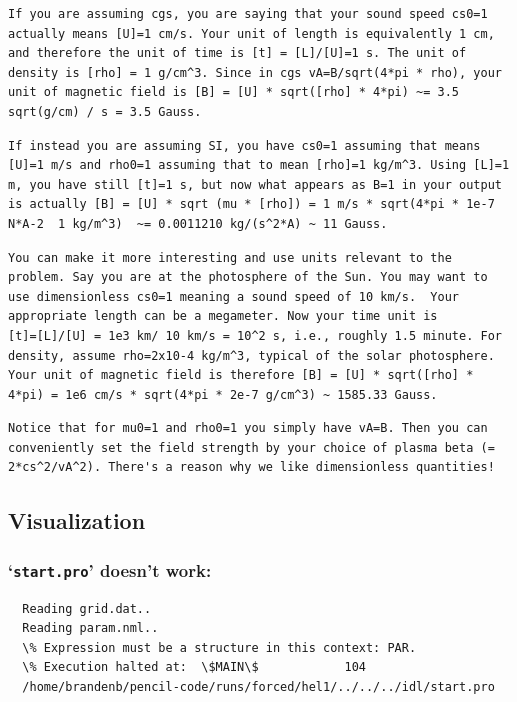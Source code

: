\documentclass[\mydriver,12pt,twoside,notitlepage,a4paper]{article}
\makeatletter
\newcommand{\file}[2][]{%
  \def\index@{#1}%
  `\texttt{#2}'%
  \ifx\index@\@empty\index[file]{#2@\texttt{#2}}%
  \else\index[file]{#1@\texttt{#1}}%
  \fi%
}
\makeatother
\begin{document}
\begin{verbatim}
If you are assuming cgs, you are saying that your sound speed cs0=1
actually means [U]=1 cm/s. Your unit of length is equivalently 1 cm,
and therefore the unit of time is [t] = [L]/[U]=1 s. The unit of
density is [rho] = 1 g/cm^3. Since in cgs vA=B/sqrt(4*pi * rho), your
unit of magnetic field is [B] = [U] * sqrt([rho] * 4*pi) ~= 3.5
sqrt(g/cm) / s = 3.5 Gauss.
\end{verbatim}

\begin{verbatim}
If instead you are assuming SI, you have cs0=1 assuming that means
[U]=1 m/s and rho0=1 assuming that to mean [rho]=1 kg/m^3. Using [L]=1
m, you have still [t]=1 s, but now what appears as B=1 in your output
is actually [B] = [U] * sqrt (mu * [rho]) = 1 m/s * sqrt(4*pi * 1e-7
N*A-2  1 kg/m^3)  ~= 0.0011210 kg/(s^2*A) ~ 11 Gauss.
\end{verbatim}

\begin{verbatim}
You can make it more interesting and use units relevant to the
problem. Say you are at the photosphere of the Sun. You may want to
use dimensionless cs0=1 meaning a sound speed of 10 km/s.  Your
appropriate length can be a megameter. Now your time unit is
[t]=[L]/[U] = 1e3 km/ 10 km/s = 10^2 s, i.e., roughly 1.5 minute. For
density, assume rho=2x10-4 kg/m^3, typical of the solar photosphere.
Your unit of magnetic field is therefore [B] = [U] * sqrt([rho] *
4*pi) = 1e6 cm/s * sqrt(4*pi * 2e-7 g/cm^3) ~ 1585.33 Gauss.
\end{verbatim}

\begin{verbatim}
Notice that for mu0=1 and rho0=1 you simply have vA=B. Then you can
conveniently set the field strength by your choice of plasma beta (=
2*cs^2/vA^2). There's a reason why we like dimensionless quantities!
\end{verbatim}


\subsection{Visualization}

\subsubsection{\file{start.pro} doesn't work:}
\begin{Verbatim}
  Reading grid.dat..
  Reading param.nml..
  \% Expression must be a structure in this context: PAR.
  \% Execution halted at:  \$MAIN\$            104
  /home/brandenb/pencil-code/runs/forced/hel1/../../../idl/start.pro
\end{Verbatim}
\end{document}

